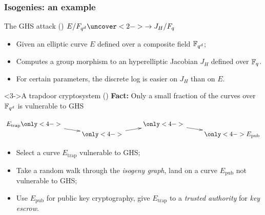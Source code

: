 \documentclass[10pt,usepdftitle=false]{beamer}
\begin{document}
\begin{frame}
  \frametitle{Isogenies: an example}

  \vspace{-1mm}

  \begin{block}{The GHS attack (\cite{gaudry+hess+smart02})}
    \centering $E/F_{q^d}\uncover<2->{\ra J_H/F_q}$

    \begin{itemize}
    \item Given an elliptic curve $E$ defined over a composite field $\mathbb{F}_{q^d}$;
    \item<2-> Computes a group morphism to an hyperelliptic Jacobian
      $J_H$ defined over $\mathbb{F}_q$.
    \item<2-> For certain parameters, the discrete log is easier on
      $J_H$ than on $E$.
    \end{itemize}
  \end{block}

  \vspace{-0.3mm}

  \begin{block}<3->{A trapdoor cryptosystem (\cite{teske06})}
    \textbf{Fact:} Only a small fraction of the curves over $\mathbb{F}_{q^d}$
    is vulnerable to GHS

    \centering
    $\xymatrix@R=0pt{
      E_{\mathrm{trap}} \only<4->{\ar[dr]} &         & \only<4->{\ar[dr]} &\\
      & \only<4->{\ar[ur]} &         & \only<4->{E_{\mathrm{pub}}}
    }$
    \begin{itemize}
    \item Select a curve $E_{\mathrm{trap}}$ vulnerable to GHS;
    \item<4-> Take a random walk through the \emph{isogeny graph},
      land on a curve $E_{\mathrm{pub}}$ not vulnerable to GHS;
    \item<5-> Use $E_{\mathrm{pub}}$ for public key cryptography, give
      $E_{\mathrm{trap}}$ to a \emph{trusted authority} for \emph{key
        escrow}.
    \end{itemize}
  \end{block}
\end{frame}

\end{document}
